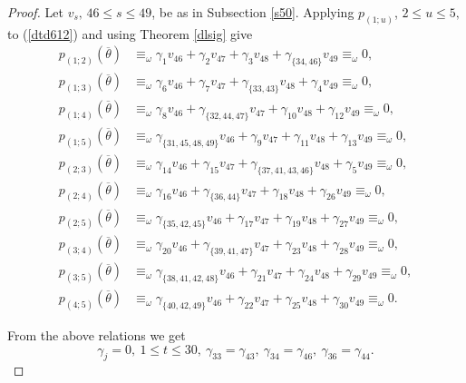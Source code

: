 \documentclass[reqno]{amsart}
\theoremstyle{plain}
\theoremstyle{definition}
\theoremstyle{plain}
\theoremstyle{definition}
\numberwithin{equation}{section}
\begin{document}
\begin{proof}
Let $v_s,\, 46\leqslant s \leqslant 49$, be as in Subsection \ref{s50}. Applying $p_{(1;u)}$, $2 \leqslant u \leqslant 5,$ to (\ref{dtd612}) and using Theorem \ref{dlsig} give
\begin{align*}
p_{(1;2)}(\overline{\theta}) &\equiv_\omega \gamma_{1}v_{46} + \gamma_{2}v_{47} + \gamma_{3}v_{48} + \gamma_{\{34,46\}}v_{49} \equiv_\omega 0,\\ 
p_{(1;3)}(\overline{\theta}) &\equiv_\omega \gamma_{6}v_{46} + \gamma_{7}v_{47} + \gamma_{\{33,43\}}v_{48} + \gamma_{4}v_{49} \equiv_\omega 0,\\
p_{(1;4)}(\overline{\theta}) &\equiv_\omega \gamma_{8}v_{46} + \gamma_{\{32,44,47\}}v_{47} + \gamma_{10}v_{48} + \gamma_{12}v_{49} \equiv_\omega 0,\\
p_{(1;5)}(\overline{\theta}) &\equiv_\omega \gamma_{\{31,45,48,49\}}v_{46} + \gamma_{9}v_{47} + \gamma_{11}v_{48} + \gamma_{13}v_{49} \equiv_\omega 0,\\
p_{(2;3)}(\overline{\theta}) &\equiv_\omega \gamma_{14}v_{46} + \gamma_{15}v_{47} + \gamma_{\{37,41,43,46\}}v_{48} + \gamma_{5}v_{49} \equiv_\omega 0,\\
p_{(2;4)}(\overline{\theta}) &\equiv_\omega \gamma_{16}v_{46} + \gamma_{\{36,44\}}v_{47} + \gamma_{18}v_{48} + \gamma_{26}v_{49} \equiv_\omega 0,\\
p_{(2;5)}(\overline{\theta}) &\equiv_\omega \gamma_{\{35,42,45\}}v_{46} + \gamma_{17}v_{47} + \gamma_{19}v_{48} + \gamma_{27}v_{49} \equiv_\omega 0,\\
p_{(3;4)}(\overline{\theta}) &\equiv_\omega \gamma_{20}v_{46} + \gamma_{\{39,41,47\}}v_{47} + \gamma_{23}v_{48} + \gamma_{28}v_{49} \equiv_\omega 0,\\
p_{(3;5)}(\overline{\theta}) &\equiv_\omega \gamma_{\{38,41,42,48\}}v_{46} + \gamma_{21}v_{47} + \gamma_{24}v_{48} + \gamma_{29}v_{49} \equiv_\omega 0,\\
p_{(4;5)}(\overline{\theta}) &\equiv_\omega \gamma_{\{40,42,49\}}v_{46} + \gamma_{22}v_{47} + \gamma_{25}v_{48} + \gamma_{30}v_{49} \equiv_\omega 0.
\end{align*}
	
From the above relations we get
\begin{equation}\label{d61}
\gamma_j = 0,\ 1\leqslant t \leqslant 30,\ \gamma_{33}= \gamma_{43},\ \gamma_{34}= \gamma_{46},\ \gamma_{36}= \gamma_{44}.
\end{equation}


\end{proof}
\end{document}
